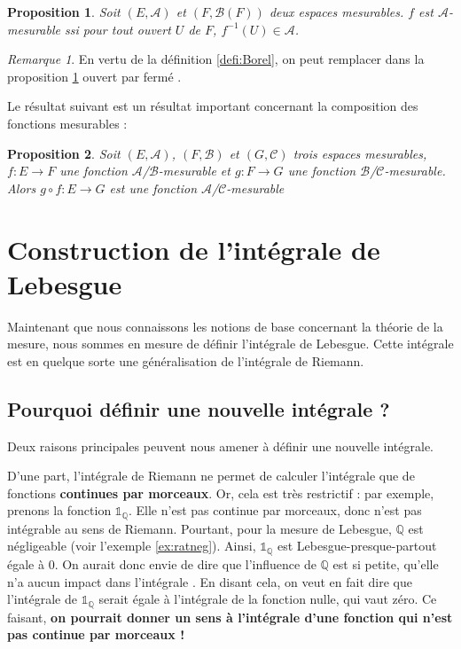 \documentclass[french]{report}
\theoremstyle{plain}
\newtheorem{prop}{Proposition}[section]
\theoremstyle{definition}
\theoremstyle{remark}
\newtheorem{rem}{Remarque}[section]
\begin{document}
\begin{prop}
  \label{prop:simp}
  Soit $\left(E, \mathcal{A}\right)$ et $\left(F, \mathcal{B}(F)\right)$ deux espaces mesurables.
  $f$ est $\mathcal{A}$-mesurable ssi pour tout ouvert $U$ de $F$, $f^{-1}(U) \in \mathcal{A}$.
\end{prop}

\begin{rem}
  En vertu de la définition \ref{defi:Borel}, on peut remplacer dans la proposition \ref{prop:simp} \og ouvert \fg par \og fermé \fg.
\end{rem}

Le résultat suivant est un résultat important concernant la composition des fonctions mesurables :

\begin{prop}
  Soit $\left(E,\mathcal{A}\right)$, $\left(F,\mathcal{B}\right)$ et $\left(G,\mathcal{C}\right)$ trois espaces mesurables,
  $f : E \longrightarrow F$ une fonction $\mathcal{A}$/$\mathcal{B}$-mesurable et $g : F \longrightarrow G$ une fonction $\mathcal{B}$/$\mathcal{C}$-mesurable.
  Alors $g \circ f : E \longrightarrow G$ est une fonction $\mathcal{A}$/$\mathcal{C}$-mesurable
\end{prop}


\chapter{Construction de l'intégrale de Lebesgue}

Maintenant que nous connaissons les notions de base concernant la théorie de la mesure, nous sommes en mesure de définir l'intégrale de Lebesgue.
Cette intégrale est en quelque sorte une généralisation de l'intégrale de Riemann.

\section{Pourquoi définir une nouvelle intégrale ?}

Deux raisons principales peuvent nous amener à définir une nouvelle intégrale.

D'une part, l'intégrale de Riemann ne permet de calculer l'intégrale que de fonctions \textbf{continues par morceaux}.
Or, cela est très restrictif : par exemple, prenons la fonction $\mathds{1}_{\mathbb{Q}}$.
Elle n'est pas continue par morceaux, donc n'est pas intégrable au sens de Riemann.
Pourtant, pour la mesure de Lebesgue, $\mathbb{Q}$ est négligeable (voir l'exemple \ref{ex:ratneg}).
Ainsi, $\mathds{1}_{\mathbb{Q}}$ est Lebesgue-presque-partout égale à $0$.
On aurait donc envie de dire que \og l'influence de $\mathbb{Q}$ est si petite, qu'elle n'a aucun impact dans l'intégrale \fg.
En disant cela, on veut en fait dire que l'intégrale de $\mathds{1}_{\mathbb{Q}}$ serait égale à l'intégrale de la fonction nulle, qui vaut zéro.
Ce faisant, \textbf{on pourrait donner un sens à l'intégrale d'une fonction qui n'est pas continue par morceaux !}
\end{document}
